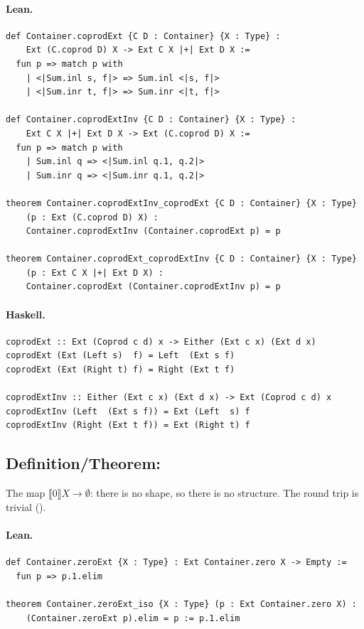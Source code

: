 \documentclass[11pt,a4paper]{article}
\begin{document}
\paragraph{Lean.}
\begin{lstlisting}[style=lean]
def Container.coprodExt {C D : Container} {X : Type} :
    Ext (C.coprod D) X -> Ext C X |+| Ext D X :=
  fun p => match p with
    | <|Sum.inl s, f|> => Sum.inl <|s, f|>
    | <|Sum.inr t, f|> => Sum.inr <|t, f|>

def Container.coprodExtInv {C D : Container} {X : Type} :
    Ext C X |+| Ext D X -> Ext (C.coprod D) X :=
  fun p => match p with
    | Sum.inl q => <|Sum.inl q.1, q.2|>
    | Sum.inr q => <|Sum.inr q.1, q.2|>

theorem Container.coprodExtInv_coprodExt {C D : Container} {X : Type}
    (p : Ext (C.coprod D) X) :
    Container.coprodExtInv (Container.coprodExt p) = p

theorem Container.coprodExt_coprodExtInv {C D : Container} {X : Type}
    (p : Ext C X |+| Ext D X) :
    Container.coprodExt (Container.coprodExtInv p) = p
\end{lstlisting}

\paragraph{Haskell.}
\begin{lstlisting}[style=haskell]
coprodExt :: Ext (Coprod c d) x -> Either (Ext c x) (Ext d x)
coprodExt (Ext (Left s)  f) = Left  (Ext s f)
coprodExt (Ext (Right t) f) = Right (Ext t f)

coprodExtInv :: Either (Ext c x) (Ext d x) -> Ext (Coprod c d) x
coprodExtInv (Left  (Ext s f)) = Ext (Left  s) f
coprodExtInv (Right (Ext t f)) = Ext (Right t) f
\end{lstlisting}


\subsection{Definition/Theorem: }

\begin{defn}
The map $\llbracket 0 \rrbracket X \to \emptyset$: there is no shape, so there is
no structure.  The round trip is trivial ().
\end{defn}

\paragraph{Lean.}
\begin{lstlisting}[style=lean]
def Container.zeroExt {X : Type} : Ext Container.zero X -> Empty :=
  fun p => p.1.elim

theorem Container.zeroExt_iso {X : Type} (p : Ext Container.zero X) :
    (Container.zeroExt p).elim = p := p.1.elim
\end{lstlisting}
\end{document}
